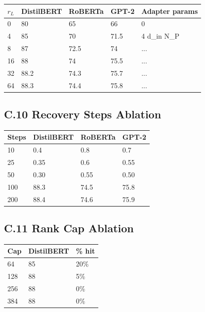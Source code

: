 \begin{table}[H]
\centering
\small
\begin{tabular}{lllll}
\toprule
\textbf{$r_L$} & \textbf{DistilBERT} & \textbf{RoBERTa} & \textbf{GPT-2} & \textbf{Adapter params} \\
\midrule
0 & 80 & 65 & 66 & 0 \\
4 & 85 & 70 & 71.5 & 4 d\_in N\_P \\
8 & 87 & 72.5 & 74 & ... \\
16 & 88 & 74 & 75.5 & ... \\
32 & 88.2 & 74.3 & 75.7 & ... \\
64 & 88.3 & 74.4 & 75.8 & ... \\
\bottomrule
\end{tabular}
\end{table}

\subsection{C.10 Recovery Steps Ablation}

\begin{table}[H]
\centering
\small
\begin{tabular}{llll}
\toprule
\textbf{Steps} & \textbf{DistilBERT} & \textbf{RoBERTa} & \textbf{GPT-2} \\
\midrule
10 & 0.4 & 0.8 & 0.7 \\
25 & 0.35 & 0.6 & 0.55 \\
50 & 0.30 & 0.55 & 0.50 \\
100 & 88.3 & 74.5 & 75.8 \\
200 & 88.4 & 74.6 & 75.9 \\
\bottomrule
\end{tabular}
\end{table}

\subsection{C.11 Rank Cap Ablation}

\begin{table}[H]
\centering
\small
\begin{tabular}{lll}
\toprule
\textbf{Cap} & \textbf{DistilBERT} & \textbf{\% hit} \\
\midrule
64 & 85 & 20\% \\
128 & 88 & 5\% \\
256 & 88 & 0\% \\
384 & 88 & 0\% \\
\bottomrule
\end{tabular}
\end{table}

